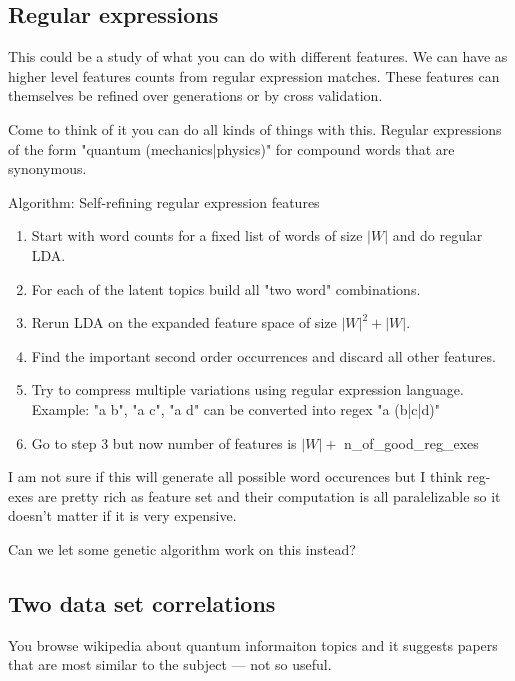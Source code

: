 \documentclass[11pt]{article}
\begin{document}
	\subsection{Regular expressions}
	
		This could be a study of what you can do with different features.
		We can have as higher level features counts from regular expression matches.
		These features can themselves be refined over generations or by cross validation.
		
		Come to think of it you can do all kinds of things with this.
		Regular expressions of the form "quantum (mechanics|physics)" for compound words 
		that are synonymous. 
		
		Algorithm: Self-refining regular expression features
		\begin{enumerate}
			\item	Start with word counts for a fixed list of words of size $|W|$ and do regular LDA.
			\item	For each of the latent topics build all "two word" combinations.
			\item	Rerun LDA on the expanded feature space of size $|W|^2 + |W|$.
			\item	Find the important second order occurrences and discard all other features.
			\item	Try to compress multiple variations using regular expression language. \\
					Example: "a b", "a c", "a d"  can be converted into regex "a (b|c|d)"
			\item	Go to step 3 but now number of features is $|W|+$ n\_of\_good\_reg\_exes
		\end{enumerate}

		I am not sure if this will generate all possible word occurences but I think reg-exes are
		pretty rich as feature set and their computation is all paralelizable so it doesn't matter if 
		it is very expensive.
		
		
		Can we let some genetic algorithm work on this instead?



    \subsection{Two data set correlations}

        You browse wikipedia about quantum informaiton topics and it suggests
        papers that are most similar to the subject --- not so useful.
\end{document}
